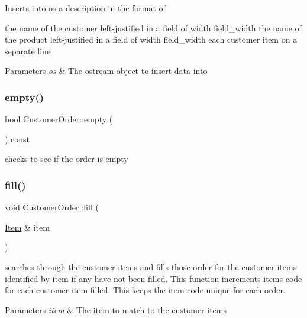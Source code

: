 Inserts into os a description in the format of

the name of the customer left-\/justified in a field of width field\+\_\+width the name of the product left-\/justified in a field of width field\+\_\+width each customer item on a separate line


\begin{DoxyParams}{Parameters}
{\em os} & The ostream object to insert data into \\
\hline
\end{DoxyParams}
\mbox{\label{class_customer_order_a8cfde59bf7a044e21508f5b595e3873c}} 
\subsubsection{\texorpdfstring{empty()}{empty()}}
{\footnotesize\ttfamily bool Customer\+Order\+::empty (\begin{DoxyParamCaption}{ }\end{DoxyParamCaption}) const}

checks to see if the order is empty \mbox{\label{class_customer_order_a317213ffac6bc2765e573893bd3f8507}} 
\subsubsection{\texorpdfstring{fill()}{fill()}}
{\footnotesize\ttfamily void Customer\+Order\+::fill (\begin{DoxyParamCaption}\item[{\mbox{\hyperlink{class_item}{Item}} \&}]{item }\end{DoxyParamCaption})}

searches through the customer items and fills those order for the customer items identified by item if any have not been filled. This function increments item\textquotesingle{}s code for each customer item filled. This keeps the item code unique for each order. 
\begin{DoxyParams}{Parameters}
{\em item} & The item to match to the customer items \\
\hline
\end{DoxyParams}
\mbox{\label{class_customer_order_a371158bfa7784275a71ebfd9feb8514b}} 
